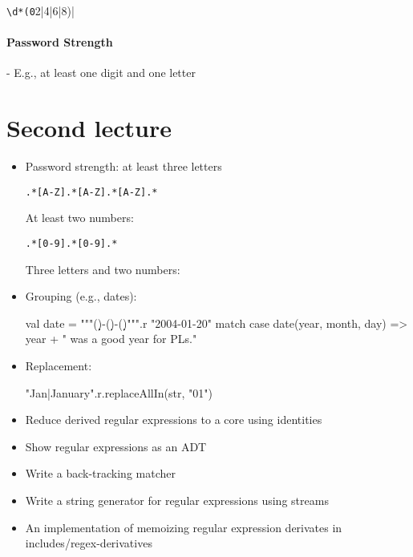 \verb|\d*(0|2|4|6|8)|

\paragraph{Password Strength}
%

- E.g., at least one digit and one letter

\section{Second lecture}

\begin{itemize}

\item Password strength: at least three letters

\begin{verbatim}
.*[A-Z].*[A-Z].*[A-Z].*
\end{verbatim}

At least two numbers:

\begin{verbatim}
.*[0-9].*[0-9].*
\end{verbatim}

Three letters and two numbers:

\item Grouping (e.g., dates):

\begin{scalacode}
    val date = """(\d\d\d\d)-(\d\d)-(\d\d)""".r
    "2004-01-20" match {
      case date(year, month, day) => year + " was a good year for PLs."
    }
\end{scalacode}

\item Replacement:

\begin{scalacode}
"Jan|January".r.replaceAllIn(str, "01")
\end{scalacode}

\item Reduce derived regular expressions to a core using identities

\item Show regular expressions as an ADT

\item Write a back-tracking matcher

\item Write a string generator for regular expressions using streams

\item An implementation of memoizing regular expression derivates in includes/regex-derivatives

\end{itemize}
